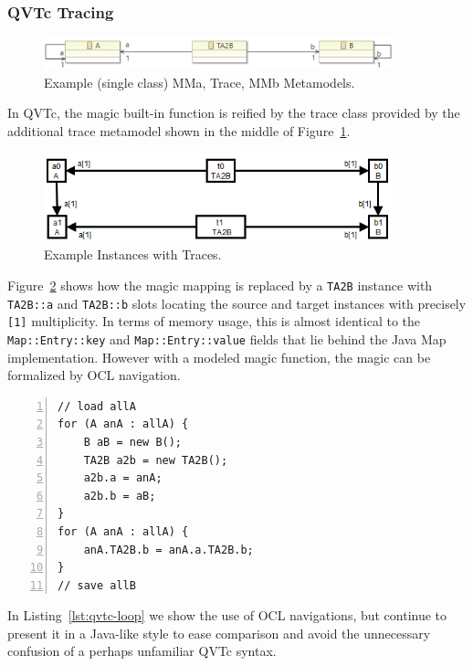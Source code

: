 \documentclass{jot}
\begin{document}
\subsubsection{QVTc Tracing}

\begin{figure}[h]
	\centering
	\includegraphics[width=0.9\textwidth]{MM3TinyIsomorph.png}
	\caption{Example (single class) MMa, Trace, MMb Metamodels.}
	\label{fig:MM3TinyIsomorph}
\end{figure}

In QVTc, the magic built-in function is reified by the trace class provided by the additional trace metamodel shown in the middle of Figure~\ref{fig:MM3TinyIsomorph}. 

\begin{figure}[h]
	\centering
	\includegraphics[width=0.9\textwidth]{TracedInstancesTinyIsomorph.png}
	\caption{Example Instances with Traces.}
	\label{fig:TracedInstancesTinyIsomorph}
\end{figure}

Figure~\ref{fig:TracedInstancesTinyIsomorph} shows how the magic mapping is replaced by a \verb|TA2B| instance with \verb|TA2B::a| and \verb|TA2B::b| slots locating the source and target instances with precisely \verb|[1]| multiplicity. In terms of memory usage, this is almost identical to the \verb|Map::Entry::key| and \verb|Map::Entry::value| fields that lie behind the Java Map implementation. However with a modeled magic function, the magic can be formalized by OCL navigation.

\begin{lstlisting}[label=lst:qvtc-loop,caption=Java-like Example Conversion Loops using the QVTc trace,captionpos=b,numbers=left]
// load allA
for (A anA : allA) {
    B aB = new B();
    TA2B a2b = new TA2B();
    a2b.a = anA;
    a2b.b = aB;
}
for (A anA : allA) {
    anA.TA2B.b = anA.a.TA2B.b;
}
// save allB
\end{lstlisting}

In Listing~\ref{lst:qvtc-loop} we show the use of OCL navigations, but continue to present it in a Java-like style to ease comparison and avoid the unnecessary confusion of a perhaps unfamiliar QVTc syntax.
\end{document}
